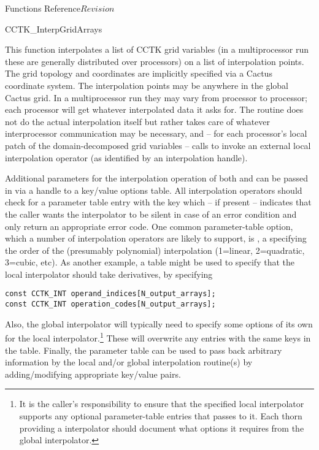 \begin{cactuspart}{ Functions Reference}{}{$Revision$}
\begin{FunctionDescription}{CCTK\_InterpGridArrays}
\begin{Discussion}
This function interpolates a list of CCTK grid variables (in a multiprocessor run
these are generally distributed over processors) on a list of interpolation
points. The grid topology and coordinates are implicitly specified via a Cactus
coordinate system.
The interpolation points may be anywhere in the global Cactus grid.
In a multiprocessor run they may vary from processor to processor;
each processor will get whatever interpolated data it asks for.
The routine  does not do the actual interpolation
itself but rather takes care of whatever interprocessor communication may be
necessary, and -- for each processor's local patch of the domain-decomposed grid
variables -- calls  to invoke an external
local interpolation operator (as identified by an interpolation handle).

Additional parameters for the interpolation operation of both
 and  can be
passed in via a handle to a key/value options table.
All interpolation operators should check for a parameter table entry with the
key  which -- if present -- indicates that the
caller wants the interpolator to be silent in case of an error condition and
only return an appropriate error code.
One common parameter-table option, which a number of interpolation
operators are likely to support, is , a 
specifying the order of the (presumably polynomial) interpolation
(1=linear, 2=quadratic, 3=cubic, etc).
As another example, a table might be used to specify that the local interpolator
should take derivatives, by specifying
\begin{verbatim}
const CCTK_INT operand_indices[N_output_arrays];
const CCTK_INT operation_codes[N_output_arrays];
\end{verbatim}
Also, the global interpolator will typically need to specify some options
of its own for the local interpolator.\footnote{
It is the caller's responsibility to ensure that the specified local
interpolator supports any optional parameter-table entries that
 passes to it. Each thorn providing a
 interpolator should document what options it
requires from the global interpolator.
}
These will overwrite any entries
with the same keys in the  table.
Finally, the parameter table can be used to pass back arbitrary information
by the local and/or global interpolation routine(s) by adding/modifying
appropriate key/value pairs.


\end{Discussion}
\end{FunctionDescription}
\end{cactuspart}
